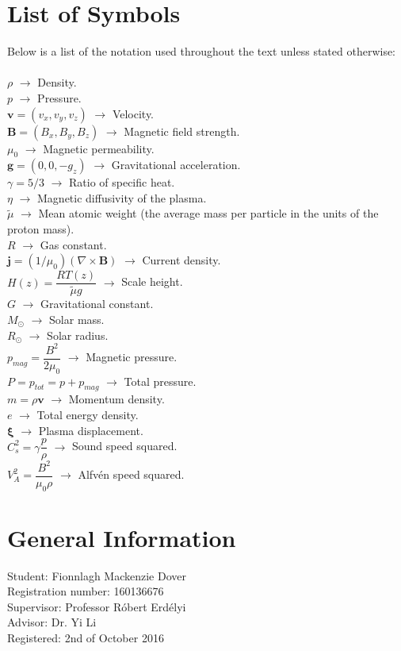 \documentclass[12pt,a4paper,twoside]{article}
\newcommand{\Alfven}{Alfv\'{e}n }
\begin{document}
\section*{List of Symbols}
Below is a list of the notation used throughout the text unless stated otherwise: \\ \\
$\rho$ $\rightarrow$ Density.  \\
$p$ $\rightarrow$ Pressure. \\
$\boldsymbol{v} = (v_x, v_y, v_z)$ $\rightarrow$ Velocity.  \\
$\boldsymbol{B} = (B_x,B_y,B_z)$ $\rightarrow$ Magnetic field strength. \\
$\mu_0$ $\rightarrow$ Magnetic permeability. \\
$\boldsymbol{g} = (0,0,-g_z)$ $\rightarrow$ Gravitational acceleration. \\
$\gamma = 5/3$ $\rightarrow$ Ratio of specific heat. \\
$\eta$ $\rightarrow$ Magnetic diffusivity of the plasma. \\
$\widetilde{\mu}$ $\rightarrow$ Mean atomic weight (the average mass per particle in the units of the proton mass).  \\
$R$ $\rightarrow$ Gas constant.\\
$\boldsymbol{j} = (1 / \mu_0) (\nabla \times \boldsymbol{B})$ $\rightarrow$ Current density.  \\
$H(z) = \dfrac{R T(z)}{\widetilde{\mu} g}$ $\rightarrow$ Scale height.  \\
$G$ $\rightarrow$ Gravitational constant. \\
$M_{\odot}$ $\rightarrow$ Solar mass. \\
$R_{\odot}$ $\rightarrow$ Solar radius. \\
$p_{mag} = \dfrac{B^2}{2 \mu_0} $ $\rightarrow$ Magnetic pressure. \\
$P=p_{tot} = p + p_{mag} $ $\rightarrow$ Total pressure. \\
$m = \rho \boldsymbol{v}$ $\rightarrow$ Momentum density. \\
$e$ $\rightarrow$ Total energy density. \\ 
$\boldsymbol{\xi}$ $\rightarrow$ Plasma displacement. \\
$C^2_s = \gamma \dfrac{p}{\rho}$ $\rightarrow$ Sound speed squared. \\ 
$V_A^2=\dfrac{B^2}{\mu_0 \rho}$ $\rightarrow$ \Alfven speed squared. 
\clearpage
\setcounter{page}{1}
\section{General Information}
Student: Fionnlagh Mackenzie Dover \\
Registration number: 160136676 \\
Supervisor: Professor R\'{o}bert Erd\'{e}lyi \\
Advisor: Dr. Yi Li \\
Registered: 2nd of October 2016
\end{document}
